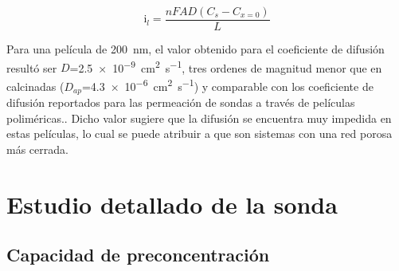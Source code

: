 			\begin{equation}
					\text{i}_l = \frac{nFAD(C_{s}-C_{x=0})}{L}
					\label{eq:de-ferroceno-bajaT}
			\end{equation}
			  	

		Para una película de \SI{200}{nm}, el valor obtenido para el coeficiente de difusión resultó ser $D$=\SI{2.5e-9}{\square\cm\per\second}, tres ordenes de magnitud menor que en \pdmF\space calcinadas ($D_{ap}$=\SI{4,3e-6}{\square\cm\per\second}) y comparable con los coeficiente de difusión reportados para las permeación de sondas a través de películas poliméricas.\cite{Kolb1993}. Dicho valor sugiere que la difusión se encuentra muy impedida en estas películas, lo cual se puede atribuir a que son sistemas con una red porosa más cerrada. 

\section{Estudio detallado de la sonda \texorpdfstring{\aminorutenioCompleto}{Ru(NH3)CL3}}
	
	\subsection{Capacidad de preconcentración}\label{sub:capacidad_de_preconcentraci_n}

